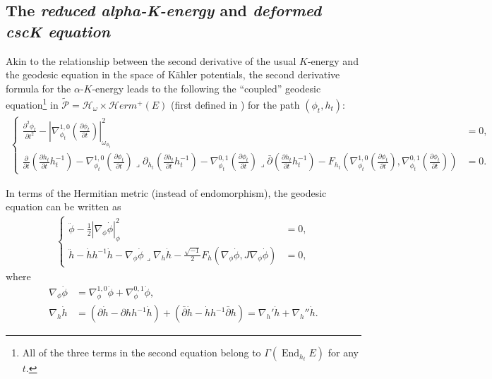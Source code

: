 \documentclass[10pt, letterpaper]{amsart}
\newcommand{\End}{\operatorname{End}}
\theoremstyle{plain}
\theoremstyle{definition}
\numberwithin{equation}{section}
\begin{document}
\subsection{The \emph{reduced alpha-K-energy} and \emph{deformed cscK equation}}\label{sec:Newgeo}
Akin to the relationship between the second derivative of the usual $K$-energy and the geodesic equation in the space of K\"ahler potentials, the second derivative formula for the $\alpha$-$K$-energy leads to the following the ``coupled'' geodesic equation\footnote{All of the three terms in the second equation belong to $\Gamma\left(\End_{h_t}E\right)$ for any $t$.} in $\widetilde{\mathcal{P}}=\mathcal{H}_\omega\times \mathcal{H}erm^+\left(E\right)$ (first defined in \cite{Garcia1})
for the path $\left(\phi_t, h_t\right)$: 
\begin{align}
\left\{
\begin{array}{rl}
 \frac{\partial^2 \phi_t}{\partial t^2}-\left|\nabla_{\phi_t}^{1,0}\left(\frac{\partial \phi_t}{\partial t}\right)\right|_{\omega_{\phi_t}}^2
    & =0, \\
     \frac{\partial}{\partial t}\left(\frac{\partial h_t}{\partial t} h_t^{-1}\right)
    - \nabla^{1,0}_{\phi_t}\left(\frac{\partial \phi_t}{\partial t}\right)\lrcorner \partial_{h_t} \left(\frac{\partial h_t}{\partial t} h_t^{-1}\right)
    - \nabla_{\phi_t}^{0,1}\left(\frac{\partial \phi_t}{\partial t}\right)\lrcorner \bar\partial \left(\frac{\partial h_t}{\partial t}h_t^{-1}\right)
    - 
	F_{h_t}\left(\nabla^{1,0}_{\phi_t}\left(\frac{\partial \phi_t}{\partial t}\right), \nabla^{0,1}_{\phi_t}\left(\frac{\partial \phi_t}{\partial t}\right)\right)
    & = 0.
\end{array}
    \right.
\end{align}

In terms of the Hermitian metric (instead of endomorphism), the geodesic equation can be written as 
\begin{align}
\left\{
\begin{array}{rl}
\ddot\phi - \frac{1}{2}\left|\nabla_\phi\dot\phi\right|_\phi^2 
& = 0,\\
\ddot h - \dot h h^{-1}\dot h 
- 
\nabla_\phi\dot\phi\lrcorner \nabla_h \dot h
- 
\frac{\sqrt{-1}}{2}F_h\left(\nabla_\phi\dot\phi, J\nabla_\phi\dot \phi\right)
& = 0,
\end{array}
\right.
\end{align}
where 
\begin{align*}
\nabla_\phi \dot\phi
& = 
\nabla^{1,0}_\phi \dot\phi + \nabla^{0,1}_\phi \dot\phi, \\
\nabla_h \dot h
& =
 \left(\partial \dot h - \partial h h^{-1}\dot h\right) 
+ 
 \left(\bar\partial \dot h - \dot h h^{-1}\bar\partial h\right)
   = \nabla_h'\dot h + \nabla_h'' \dot h.
\end{align*}
\end{document}
